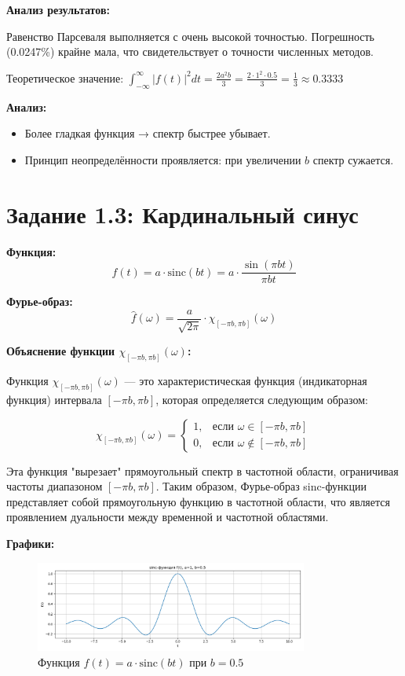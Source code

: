 \textbf{Анализ результатов:}

Равенство Парсеваля выполняется с очень высокой точностью. Погрешность (0.0247\%) крайне мала, что свидетельствует о точности численных методов.

Теоретическое значение: $\displaystyle \int_{-\infty}^{\infty} |f(t)|^2 dt = \frac{2 a^2 b}{3} = \frac{2 \cdot 1^2 \cdot 0.5}{3} = \frac{1}{3} \approx 0.3333$

\textbf{Анализ:}

\begin{itemize}
    \item Более гладкая функция → спектр быстрее убывает.
    \item Принцип неопределённости проявляется: при увеличении $b$ спектр сужается.
\end{itemize}

\section*{Задание 1.3: Кардинальный синус}

\textbf{Функция:}
\[
f(t) = a \cdot \mathrm{sinc}(bt) = a \cdot \frac{\sin(\pi b t)}{\pi b t}
\]

\textbf{Фурье-образ:}
\[
\hat{f}(\omega) = \frac{a}{\sqrt{2\pi}} \cdot \chi_{[-\pi b, \pi b]}(\omega)
\]

\textbf{Объяснение функции $\chi_{[-\pi b, \pi b]}(\omega)$:}

Функция $\chi_{[-\pi b, \pi b]}(\omega)$ — это характеристическая функция (индикаторная функция) интервала $[-\pi b, \pi b]$, которая определяется следующим образом:

\[
\chi_{[-\pi b, \pi b]}(\omega) = 
\begin{cases}
1, & \text{если } \omega \in [-\pi b, \pi b] \\
0, & \text{если } \omega \notin [-\pi b, \pi b]
\end{cases}
\]

Эта функция "вырезает" прямоугольный спектр в частотной области, ограничивая частоты диапазоном $[-\pi b, \pi b]$. Таким образом, Фурье-образ sinc-функции представляет собой прямоугольную функцию в частотной области, что является проявлением дуальности между временной и частотной областями.

\textbf{Графики:}

\begin{figure}[H]
    \centering
    \includegraphics[width=0.8\textwidth]{python/sinc_function_b0.5.png}
    \caption{Функция $f(t) = a \cdot \mathrm{sinc}(bt)$ при $b = 0.5$}
\end{figure}

